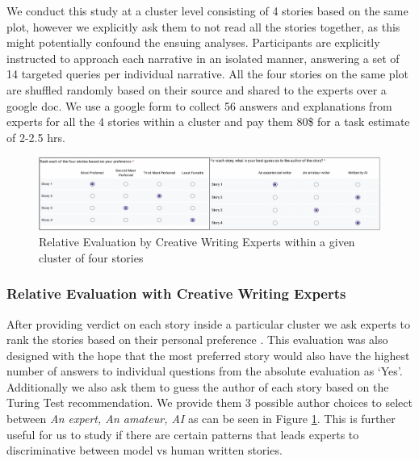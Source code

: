 We conduct this study at a cluster level consisting of 4 stories based on the same plot, however we explicitly ask them to not read all the stories together, as this might potentially confound the ensuing analyses. Participants are explicitly instructed to approach each narrative in an isolated manner, answering a set of 14 targeted queries per individual narrative. All the four stories on the same plot are shuffled randomly based on their source and shared to the experts over a google doc. We use a google form to collect 56 answers and explanations from experts for all the 4 stories within a cluster and pay them 80\$ for a task estimate of 2-2.5 hrs.
\begin{figure}
    \centering
     \includegraphics[width=\textwidth]{figures/rel.pdf}
    \caption{\label{relev} Relative Evaluation by Creative Writing Experts within a given cluster of four stories}
\end{figure}
\subsubsection{Relative Evaluation with Creative Writing Experts} After providing verdict on each story inside a particular cluster we ask experts to rank the stories based on their personal preference \cite{ouyang2022training}. This evaluation was also designed with the hope that the most preferred story would also have the highest number of answers to individual questions from the absolute evaluation as `Yes'. Additionally we also ask them to guess the author of each story based on the Turing Test recommendation. We provide them 3 possible author choices to select between \textit{An expert, An amateur, AI} as can be seen in Figure \ref{relev}. This is further useful for us to study if there are certain patterns that leads experts to discriminative between model vs human written stories.